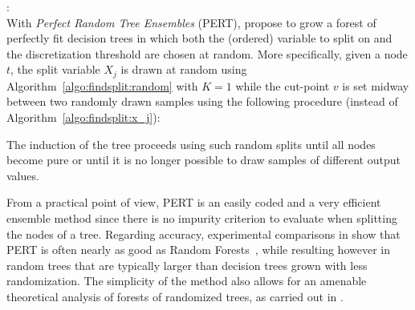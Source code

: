 \begin{description}
\item \citet{cutler:2001}: \hfill \\
    With \textit{Perfect Random Tree Ensembles} (PERT), \citet{cutler:2001}
    propose to grow a forest of perfectly fit decision trees in which both the
    (ordered) variable to split on and the discretization threshold are chosen
    at random. More specifically, given a node $t$, the split variable $X_j$ is
    drawn at random using Algorithm~\ref{algo:findsplit:random} with $K=1$
    while the cut-point $v$ is set midway between two randomly drawn samples using
    the following procedure (instead of Algorithm~\ref{algo:findsplit:x_j}):
    The induction of the tree proceeds using such random splits until
    all nodes become pure or until it is no longer possible to draw samples
    of different output values.

    From a practical point of view, PERT is an easily coded and a very
    efficient ensemble method since there is no impurity criterion to evaluate
    when splitting the nodes of a tree. Regarding accuracy, experimental
    comparisons in \citep{cutler:2001} show that PERT is often nearly as good as
    Random Forests~\citep{breiman:2001}, while resulting however in random
    trees that are typically larger than  decision trees grown with
    less randomization. The simplicity of the method also allows for an amenable
    theoretical analysis of forests of randomized trees, as carried out in \citep{zhao:2000}.


\end{description}
